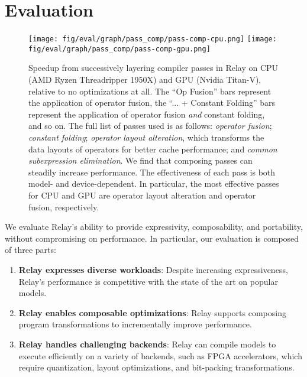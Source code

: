 \section{Evaluation}
\label{sec:eval}

%
%
%

\begin{figure*}[htp!]
  \centering
  \texttt{[image: fig/eval/graph/pass\_comp/pass-comp-cpu.png]}
  \texttt{[image: fig/eval/graph/pass\_comp/pass-comp-gpu.png]}
  \caption{\textmd{
    Speedup from successively layering compiler passes in Relay on CPU
    (AMD Ryzen Threadripper 1950X) and GPU (Nvidia Titan-V),
      relative to no optimizations at all.
    The ``Op Fusion'' bars represent the application of operator fusion,
      the ``... + Constant Folding'' bars represent the application of operator fusion \textit{and} constant folding,
      and so on.
    The full list of passes used is as follows:
      \textit{operator fusion};
      \textit{constant folding};
      \textit{operator layout alteration}, which transforms the data layouts of operators for better cache performance;
      and \textit{common subexpression elimination}.
    We find that composing passes can steadily increase performance.
    The effectiveness of each pass is both model- and device-dependent.
    In particular,
      the most effective passes for CPU and GPU are operator layout alteration and operator fusion,
      respectively.
  }}
  \label{fig:composability-eval}
\end{figure*}

We evaluate Relay's ability to provide expressivity, composability, and portability,
  without compromising on performance.
In particular, our evaluation is composed of three parts:
\begin{enumerate}
  \item \textbf{Relay expresses diverse workloads}: Despite increasing
    expressiveness, Relay's performance is competitive with the
    state of the art on popular models.
  \item \textbf{Relay enables composable optimizations}: Relay
    supports composing program transformations to incrementally improve performance.
  \item \textbf{Relay handles challenging backends}: Relay can compile
    models to execute efficiently on a variety of
    backends, such as FPGA accelerators, which require quantization, layout
    optimizations, and bit-packing transformations.
\end{enumerate}

